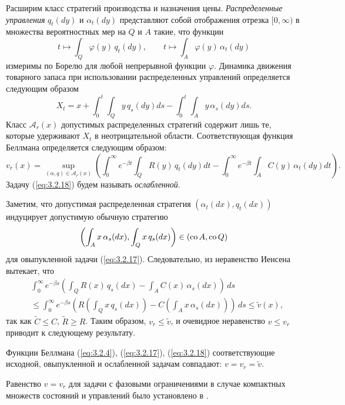 Расширим класс стратегий производства и назначения цены. \emph{Распределенные управления} $q_t(dy)$ и $\alpha_t(dy)$ представляют собой отображения отрезка $[0,\infty)$ в множества вероятностных мер на $Q$ и $A$ такие, что функции
$$ t\mapsto\int_Q\varphi(y)\,q_t(dy),\qquad t\mapsto\int_A\varphi(y)\,\alpha_t(dy)$$
измеримы по Борелю для любой непрерывной функции $\varphi$. Динамика движения товарного запаса при использовании распределенных управлений определяется следующим образом
$$ X_t=x+\int_0^t\int_Q y\,q_s(dy)ds-\int_0^t\int_A y\,\alpha_s(dy)ds.$$
Класс $\mathscr A_r(x)$ допустимых распределенных стратегий содержит лишь те, которые удерживают $X_t$ в неотрицательной области. Соответствующая функция Беллмана определяется следующим образом:
\begin{equation} \label{eq:3.2.18}
v_r(x)=\sup_{(\alpha,q)\in\mathscr A_r(x)}\left(\int_0^\infty e^{-\beta t}\int_Q R(y)\,q_t(dy)dt -\int_0^\infty e^{-\beta t} \int_A C(y)\,\alpha_t(dy)dt\right).
\end{equation}
Задачу (\ref{eq:3.2.18}) будем называть \emph{ослабленной}.


Заметим, что допустимая распределенная стратегия $(\alpha_t(dx),q_t(dx))$ индуцирует допустимую обычную стратегию
$$\left(\int_A x\,\alpha_s(dx),\int_Q x\, q_s(dx)\right)\in({\rm co\,} A,{\rm co\,} Q)$$
для овыпукленной задачи (\ref{eq:3.2.17}). Следовательно, из неравенство Иенсена вытекает, что
\begin{align*}
&\int_0^\infty e^{-\beta s}\left(\int_Q R(x)\, q_s(dx)-\int_A C(x)\,\alpha_s(dx)\right)\,ds\\
&\le \int_0^\infty e^{-\beta s}\left(R\left(\int_Q x\, q_s(dx)\right)-C\left(\int_A x\,\alpha_s(dx)\right)\right)\,ds\le\widetilde v(x),
\end{align*}
так как $\widetilde C\le C$, $\widetilde R\ge R$. Таким образом, $v_r\le\widetilde v$, и очевидное неравенство $v\le v_r$ приводит к следующему результату.
\begin{theorem} \label{th:3.2}
Функции Беллмана (\ref{eq:3.2.4}), (\ref{eq:3.2.17}), (\ref{eq:3.2.18}) соответствующие исходной, овыпукленной и ослабленной задачам совпадают:
$v=v_r=\widetilde v.$
\end{theorem}

Равенство $v=v_r$ для задачи с фазовыми ограничениями в случае компактных множеств состояний и управлений было установлено в \cite{Lor87}.

